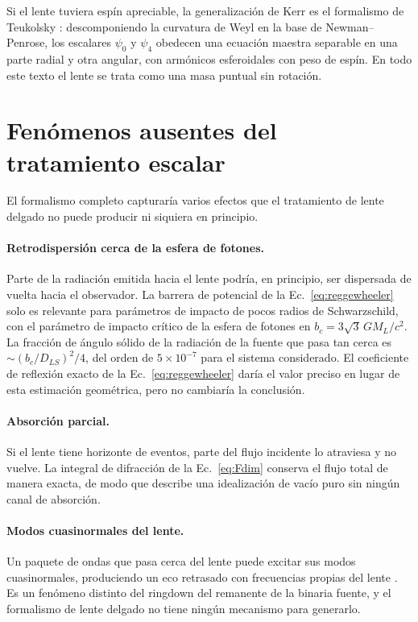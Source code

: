 \documentclass[11pt,a4paper,openany]{book}
\begin{document}
Si el lente tuviera esp\'in apreciable, la generalizaci\'on de Kerr es el
formalismo de Teukolsky \citep{Teukolsky1973}: descomponiendo la curvatura de
Weyl en la base de Newman--Penrose, los escalares $\psi_0$ y $\psi_4$ obedecen
una ecuaci\'on maestra separable en una parte radial y otra angular, con
arm\'onicos esferoidales con peso de esp\'in. En todo este texto el lente se
trata como una masa puntual sin rotaci\'on.

\section{Fen\'omenos ausentes del tratamiento escalar}
\label{sec:ausentes}

El formalismo completo capturar\'ia varios efectos que el tratamiento de lente
delgado no puede producir ni siquiera en principio.

\paragraph{Retrodispersi\'on cerca de la esfera de fotones.} Parte de la
radiaci\'on emitida hacia el lente podr\'ia, en principio, ser dispersada de
vuelta hacia el observador. La barrera de potencial de la
Ec.~\eqref{eq:reggewheeler} solo es relevante para par\'ametros de impacto de
pocos radios de Schwarzschild, con el par\'ametro de impacto cr\'itico de la
esfera de fotones en $b_c=3\sqrt{3}\,GM_L/c^{2}$. La fracci\'on de \'angulo
s\'olido de la radiaci\'on de la fuente que pasa tan cerca es
$\sim(b_c/D_{LS})^{2}/4$, del orden de $5\times10^{-7}$ para el sistema
considerado. El coeficiente de reflexi\'on exacto de la
Ec.~\eqref{eq:reggewheeler} dar\'ia el valor preciso en lugar de esta
estimaci\'on geom\'etrica, pero no cambiar\'ia la conclusi\'on.

\paragraph{Absorci\'on parcial.} Si el lente tiene horizonte de eventos, parte
del flujo incidente lo atraviesa y no vuelve. La integral de difracci\'on de
la Ec.~\eqref{eq:Fdim} conserva el flujo total de manera exacta, de modo que
describe una idealizaci\'on de vac\'io puro sin ning\'un canal de absorci\'on.

\paragraph{Modos cuasinormales del lente.} Un paquete de ondas que pasa cerca
del lente puede excitar sus modos cuasinormales, produciendo un eco retrasado
con frecuencias propias del lente \citep{BertiCardosoWill2006}. Es un
fen\'omeno distinto del ringdown del remanente de la binaria fuente, y el
formalismo de lente delgado no tiene ning\'un mecanismo para generarlo.
\end{document}
